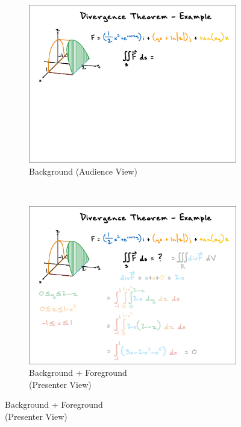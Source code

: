 \begin{figure}[h!]
    \centering
    \begin{subfigure}[t]{0.31\textwidth}
        \centering
        \includegraphics[width=1\columnwidth]{figures/videoslide1}
\captionsetup{font=footnotesize}
        \caption{Background (Audience View)}
    \end{subfigure}%
    ~ 
    \begin{subfigure}[t]{0.31\textwidth}
        \centering
        \includegraphics[width=1\columnwidth]{figures/videoslide2}
        \captionsetup{font=footnotesize}
        \caption{Background + Foreground\\ (Presenter View)}
    \end{subfigure}

\end{figure}
